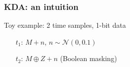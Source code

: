 \begin{frame}
\frametitle{KDA: an intuition}
%
%
%
%
\vspace{-15pt}
\begin{block}{}
Toy example: 2 time samples, 1-bit data
\begin{itemize}
\item[$t_1$:] $M + n$, $n\sim \mathcal{N}(0,0.1)$ 
\item[$t_2$:] $M\oplus Z + n$ (Boolean masking)
\end{itemize}
\end{block}

\begin{columns}
\begin{column}{.5\textwidth}
\end{column}
\end{columns}
\end{frame}

